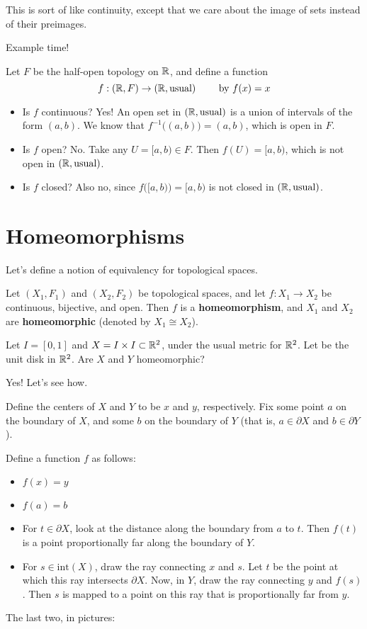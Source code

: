 This is sort of like continuity, except that we care about the image of sets instead of their preimages.

Example time!

\begin{example}
Let $F$ be the half-open topology on $\mathbb R$, and define a function \[{f:(\mathbb R,F)\to(\mathbb R,\text{usual})}\qquad\text{ by }f(x) = x\]
\end{example}
\begin{itemize}
\item Is $f$ continuous?  Yes!  An open set in $(\mathbb R, \text{usual})$ is a union of intervals of the form $(a,b)$.  We know that $f^{-1}\big((a,b)\big) = (a,b)$, which is open in $F$.
\item Is $f$ open?  No.  Take any $U = [a,b) \in F$.  Then $f(U) = [a,b)$, which is not open in $(\mathbb R, \text{usual})$.
\item Is $f$ closed? Also no, since $f\big([a,b)\big) = [a,b)$ is not closed in $(\mathbb R, \text{usual})$.
\end{itemize}

\section{Homeomorphisms}
Let's define a notion of equivalency for topological spaces.

\begin{definition}
Let $(X_1,F_1)$ and $(X_2,F_2)$ be topological spaces, and let $f:X_1\to X_2$ be continuous, bijective, and open.  Then $f$ is a {\bf homeomorphism}, and $X_1$ and $X_2$ are {\bf homeomorphic} (denoted by $X_1 \cong X_2$).
\end{definition}

\begin{example}
Let $I = [0,1]$ and $X = I\times I\subset\mathbb R^2$, under the usual metric for $\mathbb R^2$.  Let  be the unit disk in $\mathbb R^2$.  Are $X$ and $Y$ homeomorphic?
\begin{center}
\placeholder \placeholder
\end{center}
\end{example}
Yes!  Let's see how. 

Define the centers of $X$ and $Y$ to be $x$ and $y$, respectively.  Fix some point $a$ on the boundary of $X$, and some $b$ on the boundary of $Y$ (that is, $a\in \partial X$ and $b\in\partial Y$).

Define a function $f$ as follows:
\begin{itemize}
\item $f(x) = y$
\item $f(a) = b$
\item For $t\in\partial X$, look at the distance along the boundary from $a$ to $t$.  Then $f(t)$ is a point proportionally far along the boundary of $Y$.
\item For $s\in \text{int}(X)$, draw the ray connecting $x$ and $s$.  Let $t$ be the point at which this ray intersects $\partial X$.  Now, in $Y$, draw the ray connecting $y$ and $f(s)$.  Then $s$ is mapped to a point on this ray that is proportionally far from $y$.
\end{itemize}
The last two, in pictures:
\placeholder\placeholder

